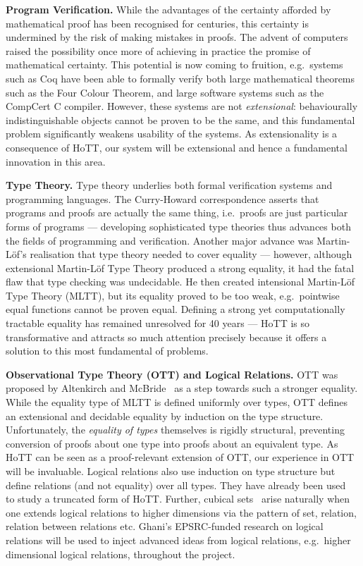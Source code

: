 \documentclass[a4paper,11pt]{article}
\newcommand{\eg}{{e.g.}\ }
\begin{document}
{\bf Program Verification.} While the advantages of the certainty
afforded by mathematical proof has been recognised for centuries, this
certainty is undermined by the risk of making mistakes in
proofs. The advent of computers raised the possibility once more of
achieving in practice the promise of mathematical certainty. This
potential is now coming to fruition, \eg systems such as Coq have been
able to formally verify both large mathematical theorems such as the
Four Colour Theorem, and large software systems such as the CompCert
C compiler. However, these systems are not {\em extensional}:
behaviourally indistinguishable objects cannot be proven to be the
same, and this fundamental problem significantly weakens usability of the
systems. As extensionality is a consequence of HoTT, our system
will be extensional and hence a fundamental innovation in this area.


{\bf Type Theory.} Type theory underlies both formal verification systems
and programming languages. The Curry-Howard correspondence asserts
that programs and proofs are actually the same thing, i.e.\ proofs are
just particular forms of programs --- developing sophisticated type
theories thus advances both the fields of programming and
verification. Another major advance was Martin-L\"of's realisation
that type theory needed to cover equality --- however, although
extensional Martin-L\"of Type Theory produced a strong equality, it
had the fatal flaw that type checking was undecidable. He then
created intensional Martin-L\"of Type Theory (MLTT), but its
equality proved to be too weak, \eg pointwise equal functions cannot
be proven equal. Defining a strong yet computationally tractable
equality has remained unresolved for 40 years --- HoTT is so transformative
and attracts so much attention precisely because it offers a solution
to this most fundamental of problems.

{\bf Observational Type Theory (OTT) and Logical Relations.} OTT was
proposed by Altenkirch and McBride~\cite{alti:ott-conf} as a step
towards such a stronger equality. While the equality type of MLTT is
defined uniformly over types, OTT defines an extensional and decidable
equality by induction on the type structure. Unfortunately, the {\em
  equality of types} themselves is rigidly structural, preventing
conversion of proofs about one type into proofs about an equivalent
type. As HoTT can be seen as a proof-relevant extension of OTT, our
experience in OTT will be invaluable. Logical relations also use
induction on type structure but define relations (and not equality)
over all types.  They have already been
used~\cite{licataHarper:canonicity2d} to study a truncated form of
HoTT. Further, cubical sets~\cite{BezemM:cubsmt} arise naturally when
one extends logical relations to higher dimensions via the pattern of
set, relation, relation between relations etc. Ghani's EPSRC-funded
research on logical relations will be used to inject advanced ideas
from logical relations, \eg higher dimensional logical relations,
throughout the project.
\end{document}
